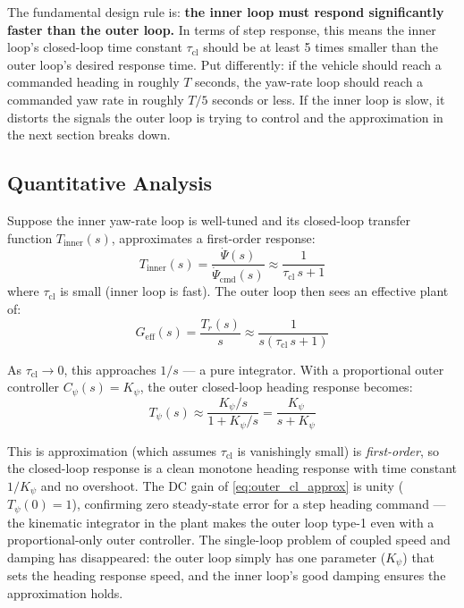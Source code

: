 \documentclass[../../book.tex]{subfiles}
\begin{document}
The fundamental design rule is: \textbf{the inner loop must respond
significantly faster than the outer loop.}  In terms of step response, this
means the inner loop's closed-loop time constant $\tau_\mathrm{cl}$ should
be at least 5 times smaller than the outer loop's desired response time.
Put differently: if the vehicle should reach a commanded heading in roughly
$T$ seconds, the yaw-rate loop should reach a commanded yaw rate in roughly
$T/5$ seconds or less.  If the inner loop is slow, it distorts the signals
the outer loop is trying to control and the approximation in the next section
breaks down.

\subsection{Quantitative Analysis}

Suppose the inner yaw-rate loop is well-tuned and its closed-loop transfer
function $T_{\mathrm{inner}}(s)$, approximates a first-order response:
\begin{equation}
  T_{\mathrm{inner}}(s) = \frac{\dot\Psi(s)}{\dot\Psi_\mathrm{cmd}(s)}
           \approx \frac{1}{\tau_\mathrm{cl}\,s + 1}
  \label{eq:inner_cl}
\end{equation}
where $\tau_\mathrm{cl}$ is small (inner loop is fast).  The outer loop then
sees an effective plant of:
\begin{equation}
  G_\mathrm{eff}(s) = \frac{T_r(s)}{s} \approx \frac{1}{s(\tau_\mathrm{cl}\,s + 1)}
  \label{eq:outer_eff}
\end{equation}

As $\tau_\mathrm{cl} \to 0$, this approaches $1/s$ --- a pure integrator.
With a proportional outer controller $C_\psi(s) = K_\psi$, the outer closed-loop
heading response becomes:
\begin{equation}
  T_\psi(s) \approx \frac{K_\psi/s}{1 + K_\psi/s} = \frac{K_\psi}{s + K_\psi}
  \label{eq:outer_cl_approx}
\end{equation}

This is approximation (which assumes $\tau_{\mathrm{cl}}$ is vanishingly small) is \emph{first-order}, so the closed-loop response is a clean monotone heading response with time
constant $1/K_\psi$ and no overshoot.  The DC gain of \cref{eq:outer_cl_approx}
is unity ($T_\psi(0) = 1$), confirming zero steady-state error for a step
heading command --- the kinematic integrator in the plant makes the outer loop
type-1 even with a proportional-only outer controller.  The single-loop problem of
coupled speed and damping has disappeared: the outer loop simply has one
parameter ($K_\psi$) that sets the heading response speed, and the inner
loop's good damping ensures the approximation holds.
\end{document}
